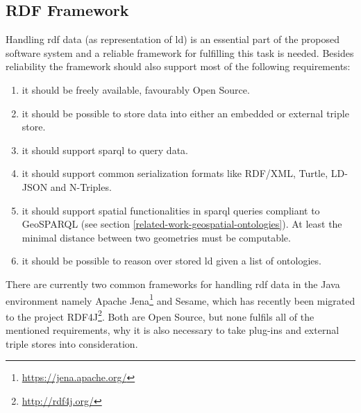 \documentclass[draft,final]{vutinfth} %
\begin{document}
\subsection{RDF Framework}
\label{solution-architectural-prototype:rdf-framework}
Handling \gls{rdf} data (as representation of \gls{ld}) is an essential part of the proposed software system and a reliable framework for fulfilling this task is needed. Besides reliability the framework should also support most of the following requirements:

\begin{enumerate}
	\item it should be freely available, favourably Open Source.
	\item it should be possible to store data into either an embedded or external triple store.
	\item it should support \gls{sparql} to query data.
	\item it should support common serialization formats like RDF/XML, Turtle, LD-JSON and N-Triples.
	\item it should support spatial functionalities in \gls{sparql} queries compliant to GeoSPARQL (see section \ref{related-work-geospatial-ontologies}). At least the minimal distance between two geometries must be computable.
	\item it should be possible to reason over stored \gls{ld} given a list of ontologies. 
\end{enumerate}

There are currently two common frameworks for handling \gls{rdf} data in the Java environment namely Apache Jena\footnote{\url{https://jena.apache.org/}} and Sesame, which has recently been migrated to the project RDF4J\footnote{\url{http://rdf4j.org/}}. Both are Open Source, but none fulfils all of the mentioned requirements, why it is also necessary to take plug-ins and external triple stores into consideration.
\end{document}
